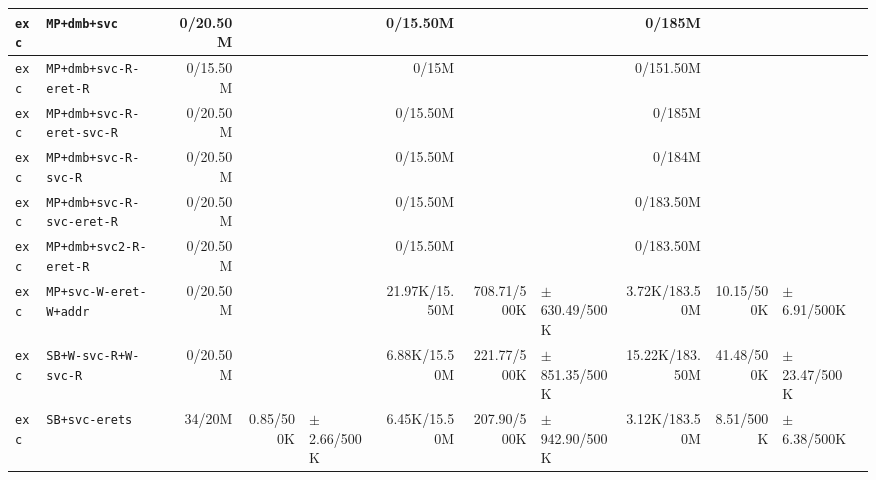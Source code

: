 \begin{tabular}{l l  | r r l | r r l | r r l l}
            \verb|exc| &                                           \verb|MP+dmb+svc| &       0/20.50M &                       &                   &       0/15.50M &                       &                   &         0/185M &                       &                    & \\ \hline 
            \verb|exc| &                                  \verb|MP+dmb+svc-R-eret-R| &       0/15.50M &                       &                   &          0/15M &                       &                   &      0/151.50M &                       &                    & \\ \hline 
            \verb|exc| &                              \verb|MP+dmb+svc-R-eret-svc-R| &       0/20.50M &                       &                   &       0/15.50M &                       &                   &         0/185M &                       &                    & \\ \hline 
            \verb|exc| &                                   \verb|MP+dmb+svc-R-svc-R| &       0/20.50M &                       &                   &       0/15.50M &                       &                   &         0/184M &                       &                    & \\ \hline 
            \verb|exc| &                              \verb|MP+dmb+svc-R-svc-eret-R| &       0/20.50M &                       &                   &       0/15.50M &                       &                   &      0/183.50M &                       &                    & \\ \hline 
            \verb|exc| &                                 \verb|MP+dmb+svc2-R-eret-R| &       0/20.50M &                       &                   &       0/15.50M &                       &                   &      0/183.50M &                       &                    & \\ \hline 
            \verb|exc| &                                 \verb|MP+svc-W-eret-W+addr| &       0/20.50M &                       &                   &  21.97K/15.50M &           708.71/500K & $\pm$ 630.49/500K &  3.72K/183.50M &            10.15/500K &    $\pm$ 6.91/500K & \\ \hline 
            \verb|exc| &                                   \verb|SB+W-svc-R+W-svc-R| &       0/20.50M &                       &                   &   6.88K/15.50M &           221.77/500K & $\pm$ 851.35/500K & 15.22K/183.50M &            41.48/500K &   $\pm$ 23.47/500K & \\ \hline 
            \verb|exc| &                                         \verb|SB+svc-erets| &         34/20M &             0.85/500K &   $\pm$ 2.66/500K &   6.45K/15.50M &           207.90/500K & $\pm$ 942.90/500K &  3.12K/183.50M &             8.51/500K &    $\pm$ 6.38/500K & \\ \hline 

\end{tabular}
